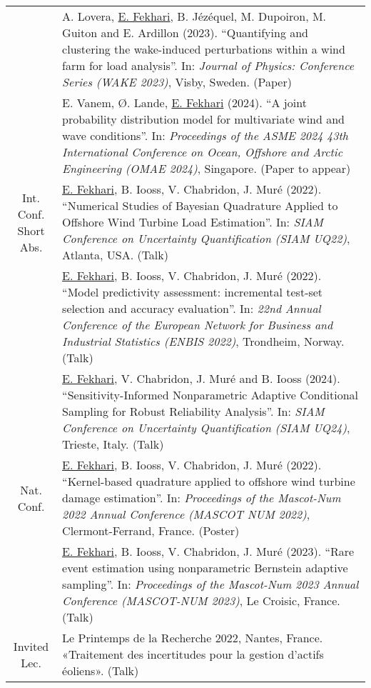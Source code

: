 \begin{center}
\begin{tabularx}{\textwidth}{c X}
                    & A. Lovera, \underline{E. Fekhari}, B. J\'{e}z\'{e}quel, M. Dupoiron, M. Guiton and E. Ardillon (2023). 
                    ``Quantifying and clustering the wake-induced perturbations within a wind farm for load analysis''. 
                    In: \textit{Journal of Physics: Conference Series (WAKE 2023)}, Visby, Sweden. (Paper)\\
                    
                    & E. Vanem, \O{}. Lande, \underline{E. Fekhari} (2024). 
                    ``A joint probability distribution model for multivariate wind and wave conditions''.
                    In: \textit{Proceedings of the ASME 2024 43th International Conference on Ocean, Offshore and Arctic Engineering (OMAE 2024)}, Singapore. (Paper to appear)\\
        \hline
\shortstack{Int. Conf.\\Short Abs.}  & \underline{E. Fekhari}, B. Iooss, V. Chabridon, J. Mur\'{e} (2022).
                    ``Numerical Studies of Bayesian Quadrature Applied to Offshore Wind Turbine Load Estimation''.
                    In: \textit{SIAM Conference on Uncertainty Quantification (SIAM UQ22)}, Atlanta, USA. (Talk)\\
        
                    & \underline{E. Fekhari}, B. Iooss, V. Chabridon, J. Mur\'{e} (2022). 
                    ``Model predictivity assessment: incremental test-set selection and accuracy evaluation''.
                    In: \textit{22nd Annual Conference of the European Network for Business and Industrial Statistics (ENBIS 2022)}, Trondheim, Norway. (Talk)\\

                    & \underline{E. Fekhari}, V. Chabridon, J. Mur\'{e} and B. Iooss (2024). 
                    ``Sensitivity-Informed Nonparametric Adaptive Conditional Sampling for Robust Reliability Analysis''. 
                    In: \textit{SIAM Conference on Uncertainty Quantification (SIAM UQ24)}, Trieste, Italy. (Talk)\\
        \hline
        Nat. Conf.  & \underline{E. Fekhari}, B. Iooss, V. Chabridon, J. Mur\'{e} (2022).
                    ``Kernel-based quadrature applied to offshore wind turbine damage estimation''. 
                    In: \textit{Proceedings of the Mascot-Num 2022 Annual Conference (MASCOT NUM 2022)}, Clermont-Ferrand, France. (Poster)\\
        
                    & \underline{E. Fekhari}, B. Iooss, V. Chabridon, J. Mur\'{e} (2023).
                    ``Rare event estimation using nonparametric Bernstein adaptive sampling''. 
                    In: \textit{Proceedings of the Mascot-Num 2023 Annual Conference (MASCOT-NUM 2023)}, Le Croisic, France. (Talk)\\
        \hline
        Invited Lec.& Le Printemps de la Recherche 2022, Nantes, France. «Traitement des incertitudes pour la gestion d’actifs \'{e}oliens». (Talk)\\


\end{tabularx}
\end{center}
